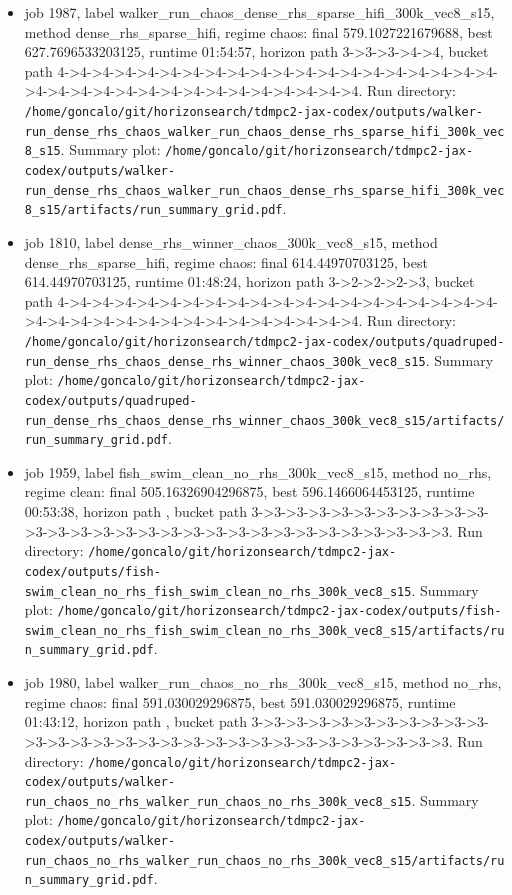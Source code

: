\begin{itemize}
\item job 1987, label walker\_run\_chaos\_dense\_rhs\_sparse\_hifi\_300k\_vec8\_s15, method dense\_rhs\_sparse\_hifi, regime chaos: final 579.1027221679688, best 627.7696533203125, runtime 01:54:57, horizon path 3->3->3->4->4, bucket path 4->4->4->4->4->4->4->4->4->4->4->4->4->4->4->4->4->4->4->4->4->4->4->4->4->4->4->4->4->4->4->4->4->4->4. Run directory: \texttt{/home/goncalo/git/horizonsearch/tdmpc2-jax-codex/outputs/walker-run\_dense\_rhs\_chaos\_walker\_run\_chaos\_dense\_rhs\_sparse\_hifi\_300k\_vec8\_s15}. Summary plot: \texttt{/home/goncalo/git/horizonsearch/tdmpc2-jax-codex/outputs/walker-run\_dense\_rhs\_chaos\_walker\_run\_chaos\_dense\_rhs\_sparse\_hifi\_300k\_vec8\_s15/artifacts/run\_summary\_grid.pdf}.
\item job 1810, label dense\_rhs\_winner\_chaos\_300k\_vec8\_s15, method dense\_rhs\_sparse\_hifi, regime chaos: final 614.44970703125, best 614.44970703125, runtime 01:48:24, horizon path 3->2->2->2->3, bucket path 4->4->4->4->4->4->4->4->4->4->4->4->4->4->4->4->4->4->4->4->4->4->4->4->4->4->4->4->4->4->4->4->4->4->4. Run directory: \texttt{/home/goncalo/git/horizonsearch/tdmpc2-jax-codex/outputs/quadruped-run\_dense\_rhs\_chaos\_dense\_rhs\_winner\_chaos\_300k\_vec8\_s15}. Summary plot: \texttt{/home/goncalo/git/horizonsearch/tdmpc2-jax-codex/outputs/quadruped-run\_dense\_rhs\_chaos\_dense\_rhs\_winner\_chaos\_300k\_vec8\_s15/artifacts/run\_summary\_grid.pdf}.
\item job 1959, label fish\_swim\_clean\_no\_rhs\_300k\_vec8\_s15, method no\_rhs, regime clean: final 505.16326904296875, best 596.1466064453125, runtime 00:53:38, horizon path , bucket path 3->3->3->3->3->3->3->3->3->3->3->3->3->3->3->3->3->3->3->3->3->3->3->3->3->3->3->3->3->3. Run directory: \texttt{/home/goncalo/git/horizonsearch/tdmpc2-jax-codex/outputs/fish-swim\_clean\_no\_rhs\_fish\_swim\_clean\_no\_rhs\_300k\_vec8\_s15}. Summary plot: \texttt{/home/goncalo/git/horizonsearch/tdmpc2-jax-codex/outputs/fish-swim\_clean\_no\_rhs\_fish\_swim\_clean\_no\_rhs\_300k\_vec8\_s15/artifacts/run\_summary\_grid.pdf}.
\item job 1980, label walker\_run\_chaos\_no\_rhs\_300k\_vec8\_s15, method no\_rhs, regime chaos: final 591.030029296875, best 591.030029296875, runtime 01:43:12, horizon path , bucket path 3->3->3->3->3->3->3->3->3->3->3->3->3->3->3->3->3->3->3->3->3->3->3->3->3->3->3->3->3->3. Run directory: \texttt{/home/goncalo/git/horizonsearch/tdmpc2-jax-codex/outputs/walker-run\_chaos\_no\_rhs\_walker\_run\_chaos\_no\_rhs\_300k\_vec8\_s15}. Summary plot: \texttt{/home/goncalo/git/horizonsearch/tdmpc2-jax-codex/outputs/walker-run\_chaos\_no\_rhs\_walker\_run\_chaos\_no\_rhs\_300k\_vec8\_s15/artifacts/run\_summary\_grid.pdf}.

\end{itemize}
